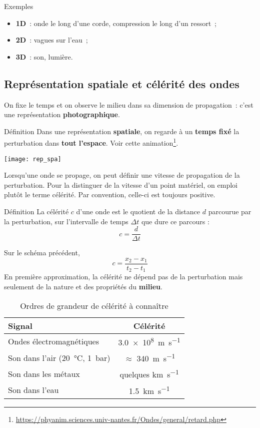 \documentclass[../main/main.tex]{subfiles}
\begin{document}
\begin{rexem}{Exemples}
    \begin{itemize}
        \item \textbf{1D}~: onde le long d'une corde, compression le long d'un
            ressort~;
        \item \textbf{2D}~: vagues sur l'eau~;
        \item \textbf{3D}~: son, lumière.
    \end{itemize}
\end{rexem}

\subsection{Représentation spatiale et célérité des ondes}
On fixe le temps et on observe le milieu dans sa dimension de propagation~:
c'est une représentation \textbf{photographique}.

\begin{rdefi}{\tiny Définition}
    Dans une représentation \textbf{spatiale}, on regarde à un \textbf{temps
    fixé} la perturbation dans \textbf{tout l’espace}. Voir cette
animation\footnote{\url{https://phyanim.sciences.univ-nantes.fr/Ondes/general/retard.php}}.
\end{rdefi}

\begin{center}
    \texttt{[image: rep\_spa]}
\end{center}

Lorsqu’une onde se propage, on peut définir une vitesse de propagation de la
perturbation. Pour la distinguer de la vitesse d’un point matériel, on emploi
plutôt le terme célérité. Par convention, celle-ci est toujours positive.

\begin{bdefi}{Définition}
    La célérité $c$ d’une onde est le quotient de la distance $d$ parcourue par la
    perturbation, sur l’intervalle de temps $\Delta t$ que dure ce parcours :
    \[\boxed{c = \frac{d}{\Delta t}}\]
\end{bdefi}

Sur le schéma précédent,
\[
    c = \frac{x_2-x_1}{t_2-t_1}
\]
En première approximation, la célérité ne dépend pas de la perturbation mais
seulement de la nature et des propriétés du \textbf{milieu}.
\begin{table}[h]
    \centering
    \caption{Ordres de grandeur de célérité à connaître}
    \label{tab:ctoknow}
    \begin{tabular}{lc}
        \toprule
        Signal & Célérité
        \\\midrule
        Ondes électromagnétiques & \SI{3.0e8}{m.s^{-1}}
        \\
        Son dans l'air (\SI{20}{\degreeCelsius}, \SI{1}{bar}) & $\approx$
        \SI{340}{m.s^{-1}}
        \\
        Son dans les métaux & quelques \si{km.s^{-1}}
        \\
        Son dans l'eau & \SI{1.5}{km.s^{-1}}
        \\\bottomrule
    \end{tabular}
\end{table}
\end{document}

